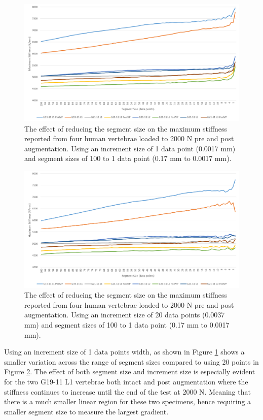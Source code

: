 \begin{figure}[ht!]
  \centering
  \includegraphics[width=6in]{Chapters/Chapter_HT_images/findStiffness_1incr.png}
  \caption{The effect of reducing the segment size on the maximum stiffness
    reported from four human vertebrae loaded to 2000 N pre and post
    augmentation. Using an increment size of 1 data point (0.0017 mm) and
    segment sizes of 100 to 1 data point (0.17 mm to 0.0017 mm).}
  \label{fig:findStiffness_1incr}
\end{figure}

\begin{figure}[ht!]
  \centering
  \includegraphics[width=6in]{Chapters/Chapter_HT_images/findStiffness_20incr.png}
  \caption{The effect of reducing the segment size on the maximum stiffness
    reported from four human vertebrae loaded to 2000 N pre and post
    augmentation. Using an increment size of 20 data points (0.0037 mm) and
    segment sizes of 100 to 1 data point (0.17 mm to 0.0017 mm).}
  \label{fig:findStiffness_20incr}
\end{figure}

Using an increment size of 1 data points width, as shown in Figure
\ref{fig:findStiffness_1incr} shows a smaller variation across the range of
segment sizes compared to using 20 points in Figure
\ref{fig:findStiffness_20incr}. The effect of both segment size and increment
size is especially evident for the two G19-11 L1 vertebrae both intact and post
augmentation where the stiffness continues to increase until the end of the test
at 2000 N. Meaning that there is a much smaller linear region for these two
specimens, hence requiring a smaller segment size to measure the largest
gradient.

